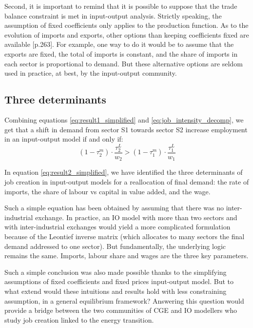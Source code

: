 Second, it is important to remind that it is possible to suppose that the trade balance constraint is met in input-output analysis. 
Strictly speaking, the assumption of fixed coefficients only applies to the production function. 
As to the evolution of imports and exports, other options  than keeping coefficients fixed are available \citep{Stoleru1969}[p.263]. 
For example, one way to do it would be to assume that the exports are fixed, the total of imports is constant, and the share of imports in each sector is proportional to demand.
But these alternative options are seldom used in practice, at best,  by the input-output community.


\subsection{Three determinants}

Combining equations \ref{eq:result1_simplified} and \ref{eq:job_intensity_decomp}, we get that a shift in demand from sector S1 towards sector S2 increase employment in an input-output model if and only if:
\begin{equation}
(1-\tau^m_2) \cdot \frac{\tau^L_2}{w_2} > (1-\tau^m_1) \cdot \frac{\tau^L_1}{w_1}
\label{eq:result2_simplified}
\end{equation}

In equation \ref{eq:result2_simplified}, we have identified the three determinants of job creation in input-output models for a reallocation of final demand: the rate of imports, the share of labour vs capital in value added, and the wage. 

Such a simple equation has been obtained by assuming that there was no inter-industrial exchange. In practice, an IO model with more than two sectors and with inter-industrial exchanges would yield a more complicated formulation because of the Leontief inverse matrix (which allocates to many sectors the final demand addressed to one sector).
But fundamentally, the underlying logic remains the same. Imports, labour share and wages are the three key parameters.

Such a simple conclusion was also made possible thanks to the simplifying assumptions of fixed coefficients and fixed prices input-output model.
But to what extend would these intuitions and results hold with less constraining assumption, in a general equilibrium framework?
Answering this question would provide a bridge between the two communities of CGE and IO modellers who study job creation linked to the energy transition.

